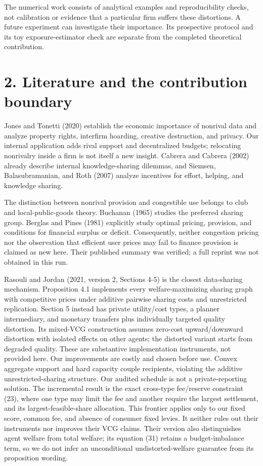 \documentclass[
  11pt,
]{article}
\begin{document}
The numerical work consists of analytical examples and reproducibility
checks, not calibration or evidence that a particular firm suffers these
distortions. A future experiment can investigate their importance. Its
prospective protocol and its toy exposure-estimator check are separate
from the completed theoretical contribution.

\section{2. Literature and the contribution
boundary}\label{literature-and-the-contribution-boundary}

Jones and Tonetti (2020) establish the economic importance of nonrival
data and analyze property rights, interfirm hoarding, creative
destruction, and privacy. Our internal application adds rival support
and decentralized budgets; relocating nonrivalry inside a firm is not
itself a new insight. Cabrera and Cabrera (2002) already describe
internal knowledge-sharing dilemmas, and Siemsen, Balasubramanian, and
Roth (2007) analyze incentives for effort, helping, and knowledge
sharing.

The distinction between nonrival provision and congestible use belongs
to club and local-public-goods theory. Buchanan (1965) studies the
preferred sharing group. Berglas and Pines (1981) explicitly study
optimal pricing, provision, and conditions for financial surplus or
deficit. Consequently, neither congestion pricing nor the observation
that efficient user prices may fail to finance provision is claimed as
new here. Their published summary was verified; a full reprint was not
obtained in this run.

Rasouli and Jordan (2021, version 2, Sections 4-5) is the closest
data-sharing mechanism. Proposition 4.1 implements every
welfare-maximizing sharing graph with competitive prices under additive
pairwise sharing costs and unrestricted replication. Section 5 instead
has private utility/cost types, a planner intermediary, and monetary
transfers plus individually targeted quality distortion. Its mixed-VCG
construction assumes zero-cost upward/downward distortion with isolated
effects on other agents; the distorted variant starts from degraded
quality. These are substantive implementation instruments, not provided
here. Our improvements are costly and chosen before use. Convex
aggregate support and hard capacity couple recipients, violating the
additive unrestricted-sharing structure. Our audited schedule is not a
private-reporting solution. The incremental result is the exact
cross-type fee/reserve constraint (23), where one type may limit the fee
and another require the largest settlement, and its
largest-feasible-share allocation. This frontier applies only to our
fixed score, common fee, and absence of consumer fixed levies. It
neither rules out their instruments nor improves their VCG claims. Their
version also distinguishes agent welfare from total welfare; its
equation (31) retains a budget-imbalance term, so we do not infer an
unconditional undistorted-welfare guarantee from its proposition
wording.
\end{document}
